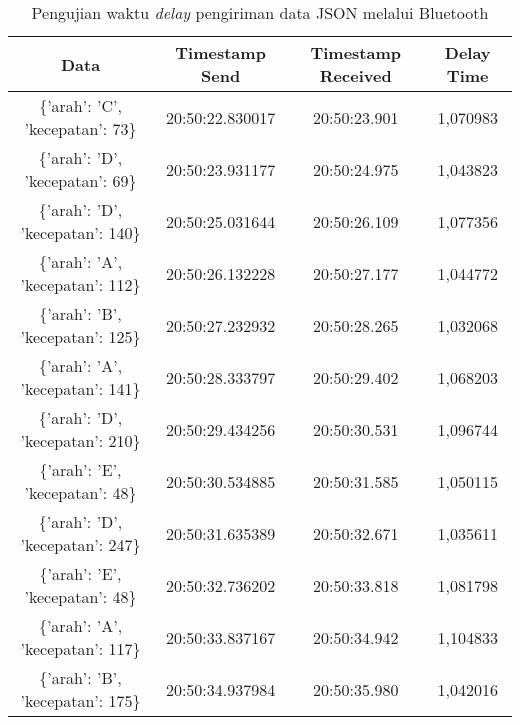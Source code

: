 \begin{table}[H]
\centering
  \caption{Pengujian waktu \emph{delay} pengiriman data JSON melalui Bluetooth}
  \label{tbl:delayBluetoothJSON}
  \begin{tabular}{|ccc|c|}
    \hline
    \multicolumn{1}{|c|}{Data}                              & \multicolumn{1}{c|}{Timestamp Send}  & Timestamp Received & Delay Time  \\ \hline
    \multicolumn{1}{|c|}{\{'arah': 'C', 'kecepatan': 73\}}  & \multicolumn{1}{c|}{20:50:22.830017} & 20:50:23.901       & 1,070983    \\ \hline
    \multicolumn{1}{|c|}{\{'arah': 'D', 'kecepatan': 69\}}  & \multicolumn{1}{c|}{20:50:23.931177} & 20:50:24.975       & 1,043823    \\ \hline
    \multicolumn{1}{|c|}{\{'arah': 'D', 'kecepatan': 140\}} & \multicolumn{1}{c|}{20:50:25.031644} & 20:50:26.109       & 1,077356    \\ \hline
    \multicolumn{1}{|c|}{\{'arah': 'A', 'kecepatan': 112\}} & \multicolumn{1}{c|}{20:50:26.132228} & 20:50:27.177       & 1,044772    \\ \hline
    \multicolumn{1}{|c|}{\{'arah': 'B', 'kecepatan': 125\}} & \multicolumn{1}{c|}{20:50:27.232932} & 20:50:28.265       & 1,032068    \\ \hline
    \multicolumn{1}{|c|}{\{'arah': 'A', 'kecepatan': 141\}} & \multicolumn{1}{c|}{20:50:28.333797} & 20:50:29.402       & 1,068203    \\ \hline
    \multicolumn{1}{|c|}{\{'arah': 'D', 'kecepatan': 210\}} & \multicolumn{1}{c|}{20:50:29.434256} & 20:50:30.531       & 1,096744    \\ \hline
    \multicolumn{1}{|c|}{\{'arah': 'E', 'kecepatan': 48\}}  & \multicolumn{1}{c|}{20:50:30.534885} & 20:50:31.585       & 1,050115    \\ \hline
    \multicolumn{1}{|c|}{\{'arah': 'D', 'kecepatan': 247\}} & \multicolumn{1}{c|}{20:50:31.635389} & 20:50:32.671       & 1,035611    \\ \hline
    \multicolumn{1}{|c|}{\{'arah': 'E', 'kecepatan': 48\}}  & \multicolumn{1}{c|}{20:50:32.736202} & 20:50:33.818       & 1,081798    \\ \hline
    \multicolumn{1}{|c|}{\{'arah': 'A', 'kecepatan': 117\}} & \multicolumn{1}{c|}{20:50:33.837167} & 20:50:34.942       & 1,104833    \\ \hline
    \multicolumn{1}{|c|}{\{'arah': 'B', 'kecepatan': 175\}} & \multicolumn{1}{c|}{20:50:34.937984} & 20:50:35.980       & 1,042016    \\ \hline

\end{tabular}
\end{table}
